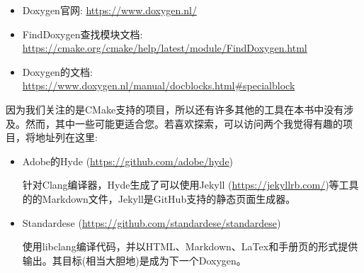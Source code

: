 

\begin{itemize}
\item 
Doxygen官网: \url{https://www.doxygen.nl/}

\item 
FindDoxygen查找模块文档: \url{https://cmake.org/cmake/help/latest/module/FindDoxygen.html}

\item 
Doxygen的文档: \url{https://www.doxygen.nl/manual/docblocks.html\#specialblock}
\end{itemize}



因为我们关注的是CMake支持的项目，所以还有许多其他的工具在本书中没有涉及。然而，其中一些可能更适合您。若喜欢探索，可以访问两个我觉得有趣的项目，将地址列在这里:

\begin{itemize}
\item 
Adobe的Hyde (\url{https://github.com/adobe/hyde})

针对Clang编译器，Hyde生成了可以使用Jekyll (\url{https://jekyllrb.com/})等工具的的Markdown文件，Jekyll是GitHub支持的静态页面生成器。

\item 
Standardese (\url{https://github.com/standardese/standardese})

使用libclang编译代码，并以HTML、Markdown、LaTex和手册页的形式提供输出。其目标(相当大胆地)是成为下一个Doxygen。
\end{itemize}



















